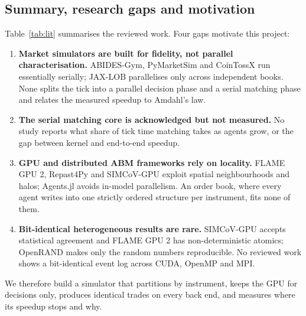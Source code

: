 \subsection{Summary, research gaps and motivation}
Table~\ref{tab:lit} summarises the reviewed work. Four gaps motivate this project:
\begin{enumerate}
\item \textbf{Market simulators are built for fidelity, not parallel characterisation.}
  ABIDES-Gym, PyMarketSim and CoinTossX run essentially serially; JAX-LOB parallelises only across
  independent books. None splits the tick into a parallel decision phase and a serial matching
  phase and relates the measured speedup to Amdahl's law.
\item \textbf{The serial matching core is acknowledged but not measured.} No study reports what
  share of tick time matching takes as agents grow, or the gap between kernel and end-to-end
  speedup.
\item \textbf{GPU and distributed ABM frameworks rely on locality.} FLAME GPU 2, Repast4Py and
  SIMCoV-GPU exploit spatial neighbourhoods and halos; Agents.jl avoids in-model parallelism. An
  order book, where every agent writes into one strictly ordered structure per instrument, fits
  none of them.
\item \textbf{Bit-identical heterogeneous results are rare.} SIMCoV-GPU accepts statistical
  agreement and FLAME GPU 2 has non-deterministic atomics; OpenRAND makes only the random numbers
  reproducible. No reviewed work shows a bit-identical event log across CUDA, OpenMP and MPI.
\end{enumerate}
We therefore build a simulator that partitions by instrument, keeps the GPU for decisions only,
produces identical trades on every back end, and measures where its speedup stops and why.

